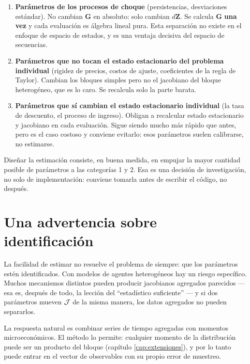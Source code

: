 \begin{receta}
\begin{enumerate}[leftmargin=1.4em,itemsep=2pt]
\item \textbf{Parámetros de los procesos de choque} (persistencias,
desviaciones estándar). No cambian $\mathbf{G}$ en absoluto: solo cambian
$d\mathbf{Z}$. Se calcula $\mathbf{G}$ \textbf{una vez} y cada evaluación es
álgebra lineal pura. Esta separación no existe en el enfoque de espacio de
estados, y es una ventaja decisiva del espacio de secuencias.
\item \textbf{Parámetros que no tocan el estado estacionario del problema
individual} (rigidez de precios, costos de ajuste, coeficientes de la regla de
Taylor). Cambian los bloques simples pero no el jacobiano del bloque
heterogéneo, que es lo caro. Se recalcula solo la parte barata.
\item \textbf{Parámetros que sí cambian el estado estacionario individual} (la
tasa de descuento, el proceso de ingreso). Obligan a recalcular estado
estacionario y jacobiano en cada evaluación. Sigue siendo mucho más rápido que
antes, pero es el caso costoso y conviene evitarlo: esos parámetros suelen
calibrarse, no estimarse.
\end{enumerate}
\end{receta}

\begin{idea}
Diseñar la estimación consiste, en buena medida, en empujar la mayor cantidad
posible de parámetros a las categorías 1 y 2. Esa es una decisión de
investigación, no solo de implementación: conviene tomarla antes de escribir el
código, no después.
\end{idea}

\section{Una advertencia sobre identificación}

La facilidad de estimar no resuelve el problema de siempre: que los parámetros
estén identificados. Con modelos de agentes heterogéneos hay un riesgo
específico. Muchos mecanismos distintos pueden producir jacobianos agregados
parecidos --- esa es, después de todo, la lección del ``estadístico
suficiente'' --- y si dos parámetros mueven $\mathcal{J}$ de la misma manera, los datos
agregados no pueden separarlos.

La respuesta natural es combinar series de tiempo agregadas con momentos
microeconómicos. El método lo permite: cualquier momento de la distribución
puede ser un producto del bloque (capítulo \ref{cap:extensiones}), y por lo
tanto puede entrar en el vector de observables con su propio error de muestreo.

